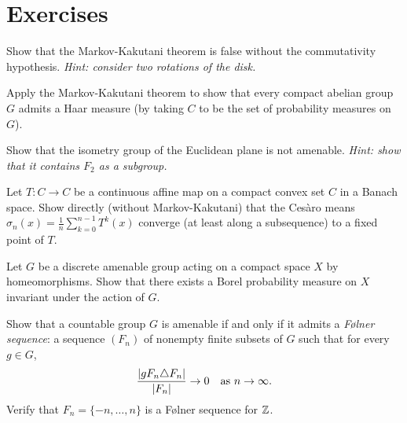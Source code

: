 \section{Exercises}

\begin{exercise}
Show that the Markov-Kakutani theorem is false without the commutativity hypothesis.
\emph{Hint: consider two rotations of the disk.}
\end{exercise}

\begin{exercise}
Apply the Markov-Kakutani theorem to show that every compact abelian group $G$ admits a
Haar measure (by taking $C$ to be the set of probability measures on $G$).
\end{exercise}

\begin{exercise}
Show that the isometry group of the Euclidean plane is not amenable.
\emph{Hint: show that it contains $F_2$ as a subgroup.}
\end{exercise}

\begin{exercise}
Let $T\colon C \to C$ be a continuous affine map on a compact convex set $C$ in a Banach
space. Show directly (without Markov-Kakutani) that the Ces\`aro means
$\sigma_n(x) = \frac{1}{n}\sum_{k=0}^{n-1} T^k(x)$ converge (at least along a
subsequence) to a fixed point of $T$.
\end{exercise}

\begin{exercise}
Let $G$ be a discrete amenable group acting on a compact space $X$ by homeomorphisms.
Show that there exists a Borel probability measure on $X$ invariant under the action of $G$.
\end{exercise}

\begin{exercise}
Show that a countable group $G$ is amenable if and only if it admits a \emph{F\o lner
sequence}: a sequence $(F_n)$ of nonempty finite subsets of $G$ such that for every
$g \in G$,
\[
  \frac{\left| gF_n \triangle F_n \right|}{\left| F_n \right|} \to 0 \quad \text{as } n \to \infty.
\]
Verify that $F_n = \{-n, \ldots, n\}$ is a F\o lner sequence for $\mathbb{Z}$.
\end{exercise}
